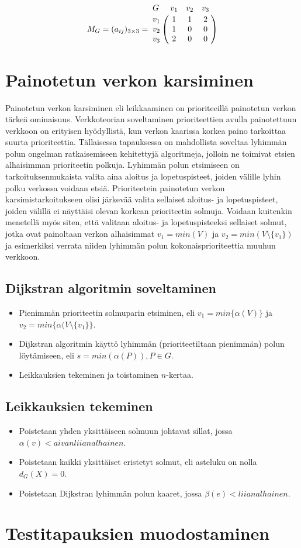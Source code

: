 \[
  M_G = (a_{ij})_{3\times3} =
  \bordermatrix{
    G & v_1 & v_2 & v_3 \cr
    v_1 & 1 & 1 & 2 \cr
    v_2 & 1 & 0 & 0 \cr
    v_3 & 2 & 0 & 0 \cr
  }
\]

\section{Painotetun verkon karsiminen}

Painotetun verkon karsiminen eli leikkaaminen on prioriteeillä painotetun verkon tärkeä ominaisuus.
Verkkoteorian soveltaminen prioriteettien avulla painotettuun verkkoon on erityisen hyödyllistä, kun verkon kaarissa korkea paino tarkoittaa suurta prioriteettia.
Tällaisessa tapauksessa on mahdollista soveltaa lyhimmän polun ongelman ratkaisemiseen kehitettyjä algoritmeja, jolloin ne toimivat etsien alhaisimman prioriteetin polkuja.
Lyhimmän polun etsimiseen on tarkoituksenmukaista valita aina aloitus ja lopetuspisteet, joiden välille lyhin polku verkossa voidaan etsiä.
Prioriteetein painotetun verkon karsimistarkoitukseen olisi järkevää valita sellaiset aloitus- ja lopetuspisteet, joiden välillä ei näyttäisi olevan korkean prioriteetin solmuja.
Voidaan kuitenkin menetellä myös siten, että valitaan aloitus- ja lopetuspisteeksi sellaiset solmut, jotka ovat painoltaan verkon alhaisimmat \(v_1 = min(V)\) ja \(v_2 = min(V \setminus \{v_1\})\) ja esimerkiksi verrata niiden lyhimmän polun kokonaisprioriteettia muuhun verkkoon.

  \subsection{Dijkstran algoritmin soveltaminen}

  \begin{itemize}
    \item Pienimmän prioriteetin solmuparin etsiminen, eli \(v_1 = min\{ \alpha(V) \}\) ja \(v_2 = min\{\alpha( V \setminus \{v_1\} \}\).
    \item Dijkstran algoritmin käyttö lyhimmän (prioriteetiltaan pienimmän) polun löytämiseen, eli \(s = min( \alpha(P) ), P \in G\).
    \item Leikkauksien tekeminen ja toistaminen \(n\)-kertaa.
  \end{itemize}

  \subsection{Leikkauksien tekeminen}

  \begin{itemize}
    \item Poistetaan yhden yksittäiseen solmuun johtavat sillat, jossa \(\alpha(v) < aivan liian alhainen \).
    \item Poistetaan kaikki yksittäiset eristetyt solmut, eli asteluku on nolla \(d_G(X) = 0\).
    \item Poistetaan Dijkstran lyhimmän polun kaaret, jossa \(\beta(e) < liian alhainen \).
  \end{itemize}

\section{Testitapauksien muodostaminen}
